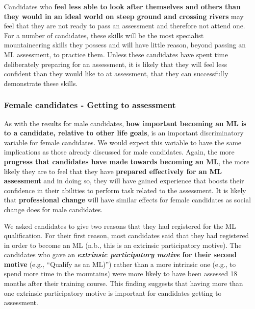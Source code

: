 \documentclass[a4paper,]{book}
\begin{document}
Candidates who \textbf{feel less able to look after themselves and others than they would in an ideal world on steep ground and crossing rivers} may feel that they are not ready to pass an assessment and therefore not attend one. For a number of candidates, these skills will be the most specialist mountaineering skills they possess and will have little reason, beyond passing an ML assessment, to practice them. Unless these candidates have spent time deliberately preparing for an assessment, it is likely that they will feel less confident than they would like to at assessment, that they can successfully demonstrate these skills.

\hypertarget{female-candidates---getting-to-assessment}{%
\subsubsection{Female candidates - Getting to assessment}\label{female-candidates---getting-to-assessment}}

As with the results for male candidates, \textbf{how important becoming an ML is to a candidate, relative to other life goals}, is an important discriminatory variable for female candidates. We would expect this variable to have the same implications as those already discussed for male candidates. Again, the more \textbf{progress that candidates have made towards becoming an ML}, the more likely they are to feel that they have \textbf{prepared effectively for an ML assessment} and in doing so, they will have gained experience that boosts their confidence in their abilities to perform task related to the assessment. It is likely that \textbf{professional change} will have similar effects for female candidates as social change does for male candidates.

We asked candidates to give two reasons that they had registered for the ML qualification. For their first reason, most candidates said that they had registered in order to become an ML (n.b., this is an extrinsic participatory motive). The candidates who gave an \emph{\textbf{extrinsic participatory motive}} \textbf{for their second motive} (e.g., ``Qualify as an ML)'') rather than a more intrinsic one (e.g., to spend more time in the mountains) were more likely to have been assessed 18 months after their training course. This finding suggests that having more than one extrinsic participatory motive is important for candidates getting to assessment.
\end{document}
